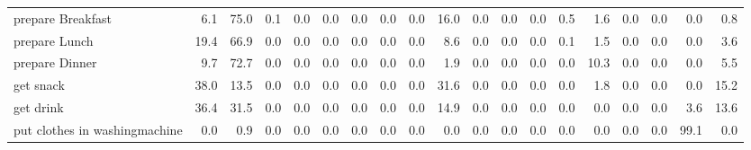 \documentclass{article}
\begin{document}
\begin{sideways}
\begin{tabular}{lrrrrrrrrrrrrrrrrrr}
prepare Breakfast             &         6.1 &               75.0 &           0.1 &                          0.0 &                0.0 &                0.0 &                        0.0 &          0.0 &             16.0 &                0.0 &                    0.0 &                      0.0 &                  0.5 &                   1.6 &              0.0 &              0.0 &                                  0.0 &          0.8 \\
prepare Lunch                 &        19.4 &               66.9 &           0.0 &                          0.0 &                0.0 &                0.0 &                        0.0 &          0.0 &              8.6 &                0.0 &                    0.0 &                      0.0 &                  0.1 &                   1.5 &              0.0 &              0.0 &                                  0.0 &          3.6 \\
prepare Dinner                &         9.7 &               72.7 &           0.0 &                          0.0 &                0.0 &                0.0 &                        0.0 &          0.0 &              1.9 &                0.0 &                    0.0 &                      0.0 &                  0.0 &                  10.3 &              0.0 &              0.0 &                                  0.0 &          5.5 \\
get snack                     &        38.0 &               13.5 &           0.0 &                          0.0 &                0.0 &                0.0 &                        0.0 &          0.0 &             31.6 &                0.0 &                    0.0 &                      0.0 &                  0.0 &                   1.8 &              0.0 &              0.0 &                                  0.0 &         15.2 \\
get drink                     &        36.4 &               31.5 &           0.0 &                          0.0 &                0.0 &                0.0 &                        0.0 &          0.0 &             14.9 &                0.0 &                    0.0 &                      0.0 &                  0.0 &                   0.0 &              0.0 &              0.0 &                                  3.6 &         13.6 \\
put clothes in washingmachine &         0.0 &                0.9 &           0.0 &                          0.0 &                0.0 &                0.0 &                        0.0 &          0.0 &              0.0 &                0.0 &                    0.0 &                      0.0 &                  0.0 &                   0.0 &              0.0 &              0.0 &                                 99.1 &          0.0 \\

\end{tabular}
\end{sideways}
\end{document}
